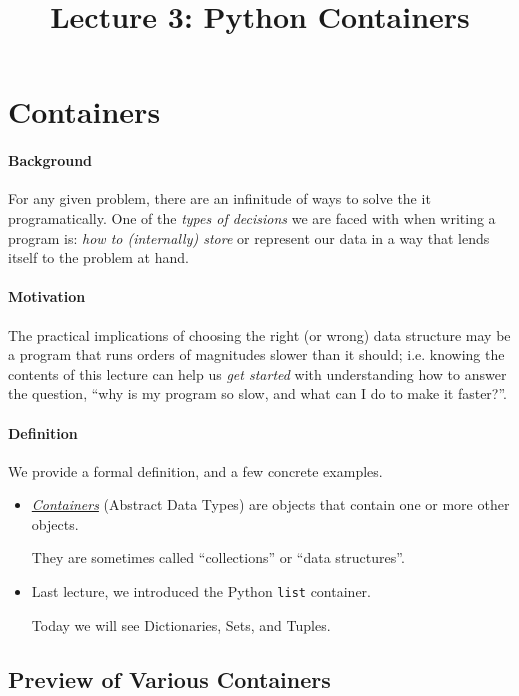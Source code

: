 \documentclass[12pt,letterpaper,twoside]{article}
\begin{document}
\title{Lecture 3: Python Containers
\date{}
\vspace{-5ex}}
\maketitle

\section{Containers}
\paragraph{Background}
For any given problem, there are an infinitude of ways to solve the it programatically.
One of the \emph{types of decisions} we are faced with when writing a program is: \emph{how to (internally) store} or represent 
our data in a way that lends itself to the problem at hand. 

\paragraph{Motivation}
The practical implications of choosing the right (or wrong) data structure
may be a program that runs orders of magnitudes slower than it should; i.e. knowing the contents of this lecture can help us \emph{get 
started} with understanding how to answer the question, ``why is my program so slow, and what can I do to make it faster?''.

\paragraph{Definition} We provide a formal definition, and a few concrete examples.
\begin{itemize}
\item \href{https://en.wikipedia.org/wiki/Container_(abstract_data_type)}{\emph{Containers}} (Abstract Data Types) 
  are objects that contain one or more other objects.

  They are sometimes called ``collections'' or ``data structures''.
\item Last lecture, we introduced the Python \texttt{list} container.
  
  Today we will see Dictionaries, Sets, and Tuples.
\end{itemize}

\subsection{Preview of Various Containers}
\end{document}
